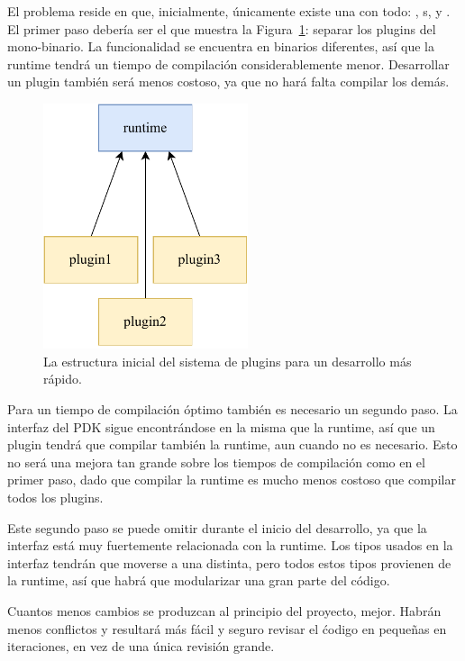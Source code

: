 El problema reside en que, inicialmente, únicamente existe una \crate con todo:
, s, y . El primer paso debería ser el
que muestra la Figura~\ref{fig:separation_temporary}: separar los plugins del
mono-binario. La funcionalidad se encuentra en binarios diferentes, así que la
runtime tendrá un tiempo de compilación considerablemente menor. Desarrollar un
plugin también será menos costoso, ya que no hará falta compilar los demás.

\begin{figure}
    \centering
    \includegraphics[width=6cm]{./Imagenes/separation-temporary.pdf}
    \caption{La estructura inicial del sistema de plugins para un desarrollo más
    rápido.}%
    \label{fig:separation_temporary}
\end{figure}

Para un tiempo de compilación óptimo también es necesario un segundo paso. La
interfaz del PDK sigue encontrándose en la misma \crate que la runtime, así que
un plugin tendrá que compilar también la runtime, aun cuando no es necesario.
Esto no será una mejora tan grande sobre los tiempos de compilación como en el
primer paso, dado que compilar la runtime es mucho menos costoso que compilar
todos los plugins.

Este segundo paso se puede omitir durante el inicio del desarrollo, ya que la
interfaz está muy fuertemente relacionada con la runtime. Los tipos usados en la
interfaz tendrán que moverse a una \crate distinta, pero todos estos tipos
provienen de la runtime, así que habrá que modularizar una gran parte del
código.

Cuantos menos cambios se produzcan al principio del proyecto, mejor. Habrán
menos conflictos y resultará más fácil y seguro revisar el ćodigo en pequeñas en
iteraciones, en vez de una única revisión grande.

